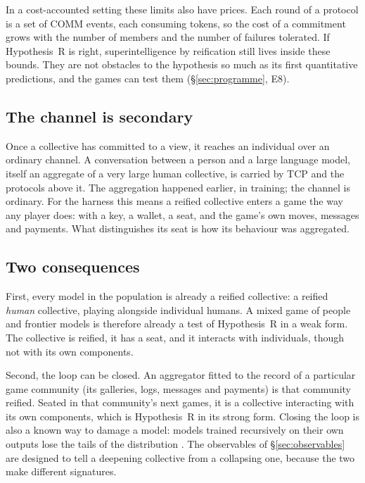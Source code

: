 \documentclass[11pt,a4paper]{article}
\begin{document}
In a cost-accounted setting these limits also have prices. Each round of a protocol is a set of
COMM events, each consuming tokens, so the cost of a commitment grows with the number of members
and the number of failures tolerated. If Hypothesis~R is right, superintelligence by reification
still lives inside these bounds. They are not obstacles to the hypothesis so much as its first
quantitative predictions, and the games can test them (\S\ref{sec:programme}, E8).

\subsection{The channel is secondary}\label{sec:channel}

Once a collective has committed to a view, it reaches an individual over an ordinary channel. A
conversation between a person and a large language model, itself an aggregate of a very large
human collective, is carried by TCP and the protocols above it. The aggregation happened earlier,
in training; the channel is ordinary. For the harness this means a reified collective enters a game
the way any player does: with a key, a wallet, a seat, and the game's own moves, messages and
payments. What distinguishes its seat is how its behaviour was aggregated.

\subsection{Two consequences}

First, every model in the population is already a reified collective: a reified \emph{human}
collective, playing alongside individual humans. A mixed game of people and frontier models is
therefore already a test of Hypothesis~R in a weak form. The collective is reified, it has a seat,
and it interacts with individuals, though not with its own components.

Second, the loop can be closed. An aggregator fitted to the record of a particular game community
(its galleries, logs, messages and payments) is that community reified. Seated in that community's
next games, it is a collective interacting with its own components, which is Hypothesis~R in its
strong form. Closing the loop is also a known way to damage a model: models trained recursively on
their own outputs lose the tails of the distribution \cite{shumailov}. The observables of
\S\ref{sec:observables} are designed to tell a deepening collective from a collapsing one, because
the two make different signatures.
\end{document}
